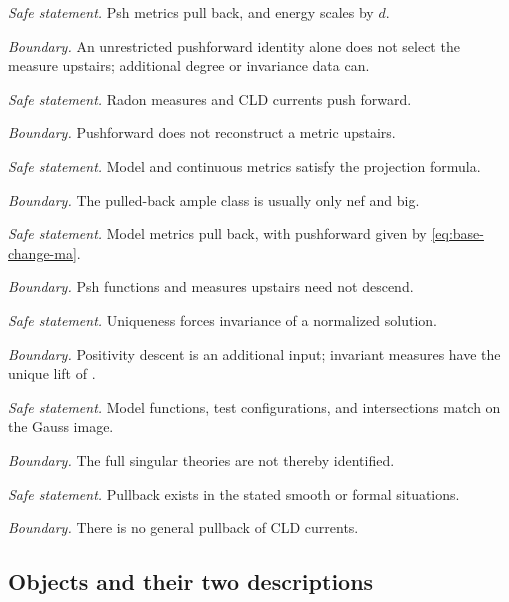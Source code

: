 \begin{description}[style=nextline,leftmargin=0pt,labelindent=0pt,
  labelsep=0pt,itemsep=.8\baselineskip,font=\normalfont\bfseries]
\item[Finite pullback]
\emph{Safe statement.} Psh metrics pull back, and energy scales by $d$.
\par\emph{Boundary.} An unrestricted pushforward identity alone does
not select the measure upstairs; additional degree or invariance data can.

\item[Proper pushforward]
\emph{Safe statement.} Radon measures and CLD currents push forward.
\par\emph{Boundary.} Pushforward does not reconstruct a metric upstairs.

\item[Birational pullback]
\emph{Safe statement.} Model and continuous metrics satisfy the projection
formula.
\par\emph{Boundary.} The pulled-back ample class is usually only nef and big.

\item[Finite field extension]
\emph{Safe statement.} Model metrics pull back, with pushforward given by
\eqref{eq:base-change-ma}.
\par\emph{Boundary.} Psh functions and measures upstairs need not descend.

\item[Galois descent]
\emph{Safe statement.} Uniqueness forces invariance of a normalized solution.
\par\emph{Boundary.} Positivity descent is an additional input;
invariant measures have the unique lift of
.

\item[Gauss extension]
\emph{Safe statement.} Model functions, test configurations, and
intersections match on the Gauss image.
\par\emph{Boundary.} The full singular theories are not thereby identified.

\item[Current pullback]
\emph{Safe statement.} Pullback exists in the stated smooth or formal
situations.
\par\emph{Boundary.} There is no general pullback of CLD currents.
\end{description}

\subsection{Objects and their two descriptions}
\label{sec:ch30-dict-objects}

